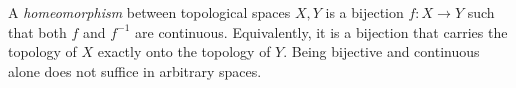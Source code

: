 
A \emph{homeomorphism} between topological spaces $X,Y$ is a bijection $f:X\to Y$ such that both $f$ and $f^{-1}$ are continuous. Equivalently, it is a bijection that carries the topology of $X$ exactly onto the topology of $Y$. Being bijective and continuous alone does not suffice in arbitrary spaces.
